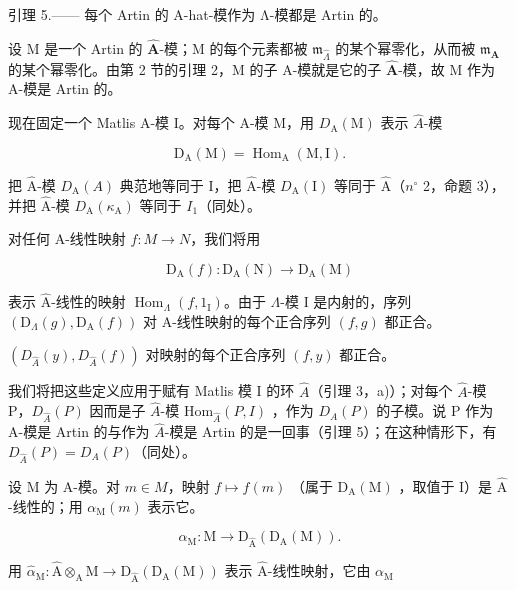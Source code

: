 引理 5.—— 每个 Artin 的 A-hat-模作为 Λ-模都是 Artin 的。

设 M 是一个 Artin 的 \(\widehat{\mathbf{A}}\)-模；M 的每个元素都被 \(\mathfrak{m}_{\widehat{\Lambda}}\) 的某个幂零化，从而被 \(\mathfrak{m}_{\mathbf{A}}\) 的某个幂零化。由第 2 节的引理 2，M 的子 A-模就是它的子 \(\widehat{\mathbf{A}}\)-模，故 M 作为 A-模是 Artin 的。

现在固定一个 Matlis A-模 I。对每个 A-模 M，用 \(D_{\mathrm{A}}(\mathrm{M})\) 表示 \(\widehat{A}\)-模

\[
\mathrm{D} _ {\mathrm{A}} (\mathrm{M}) = \operatorname{Hom} _ {\mathrm{A}} (\mathrm{M}, \mathrm{I}).
\]

把 \(\widehat{\mathrm{A}}\)-模 \(D_{\mathrm{A}}(A)\) 典范地等同于 I，把 \(\widehat{\mathrm{A}}\)-模 \(D_{\mathrm{A}}(\mathrm{I})\) 等同于 \(\widehat{\mathrm{A}}\)（\(n^{\circ}\) 2，命题 3），并把 \(\widehat{\mathrm{A}}\)-模 \(D_{\mathrm{A}}(\kappa_{\mathrm{A}})\) 等同于 \(I_{1}\)（同处）。

对任何 A-线性映射 \(f: M \rightarrow N\)，我们将用

\[
\mathrm{D} _ {\mathrm{A}} (f): \mathrm{D} _ {\mathrm{A}} (\mathrm{N}) \rightarrow \mathrm{D} _ {\mathrm{A}} (\mathrm{M})
\]

表示 \(\widehat{\mathrm{A}}\)-线性的映射 \(\operatorname{Hom}_{\Lambda}(f,1_{\mathrm{I}})\)。由于 \(\Lambda\)-模 I 是内射的，序列 \((\mathrm{D}_{\Lambda}(g),\mathrm{D}_{\mathrm{A}}(f))\) 对 A-线性映射的每个正合序列 \((f,g)\) 都正合。

\((D_{\hat{A}}(y), D_{\hat{A}}(f))\) 对映射的每个正合序列 \((f, y)\) 都正合。

我们将把这些定义应用于赋有 Matlis 模 I 的环 \(\hat{A}\)（引理 3，a)）；对每个 \(\hat{A}\)-模 P，\(D_{\hat{A}}(P)\) 因而是子 \(\hat{A}\)-模 \(\text{Hom}_{\hat{A}}(P, I)\) ，作为 \(D_{A}(P)\) 的子模。说 P 作为 A-模是 Artin 的与作为 \(\hat{A}\)-模是 Artin 的是一回事（引理 5）；在这种情形下，有 \(D_{\hat{A}}(P) = D_{A}(P)\)（同处）。

设 M 为 A-模。对 \(m \in M\)，映射 \(f \mapsto f(m)\) （属于 \(\mathrm{D}_{\mathrm{A}}(\mathrm{M})\) ，取值于 I）是 \(\widehat{\mathrm{A}}\) -线性的；用 \(\alpha_{\mathrm{M}}(m)\) 表示它。

\[
\alpha_ {\mathrm{M}}: \mathrm{M} \longrightarrow \mathrm{D} _ {\widehat {\mathrm{A}}} (\mathrm{D} _ {\mathrm{A}} (\mathrm{M})) .
\]

用 \(\widehat{\alpha}_{\mathrm{M}}:\widehat{\mathrm{A}}\otimes_{\mathrm{A}}\mathrm{M}\longrightarrow \mathrm{D}_{\widehat{\mathrm{A}}}(\mathrm{D}_{\mathrm{A}}(\mathrm{M}))\) 表示 \(\widehat{\mathrm{A}}\)-线性映射，它由 \(\alpha_{\mathrm{M}}\)

